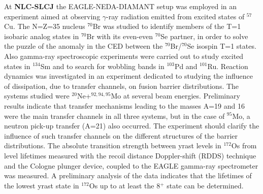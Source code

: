 At \textbf{NLC-SLCJ} the EAGLE-NEDA-DIAMANT setup was employed in an experiment aimed at observing $\gamma$-ray radiation emitted from excited states of $^{57}$Cu. 
The N=Z=35 nucleus $^{70}$Br was studied to identify members of the T=1 isobaric analog states in $^{70}$Br with its even-even $^{70}$Se partner, in order to solve the puzzle of 
the anomaly in the CED between the $^{70}$Br/$^{70}$Se isospin T=1 states.
Also gamma-ray spectroscopic experiments were carried out to study excited states in $^{134}$Sm and to search for wobbling bands in $^{103}$Pd and $^{101}$Ru.
Reaction dynamics was investigated in an experiment dedicated to studying the influence of dissipation, due to transfer channels, on fusion barrier distributions. The systems studied were $^{20}$Ne+$^{92,94,95}$Mo at several beam energies. 
Preliminary results indicate that transfer mechanisms leading to the masses A=19 and 16 were the main transfer channels in all three systems, but in the case of $^{95}$Mo, a neutron pick-up transfer (A=21) also occurred. The experiment should clarify the influence of such transfer channels on the different structures of the barrier distributions.
The absolute transition strength between yrast levels in $^{172}$Os from level lifetimes measured with the recoil distance Doppler-shift (RDDS) technique and the Cologne plunger device, coupled to the EAGLE gamma-ray spectrometer was measured. 
A preliminary analysis of the data indicates that the lifetimes of the lowest yrast state in $^{172}$Os up to at least the 8$^+$ state can be determined.

